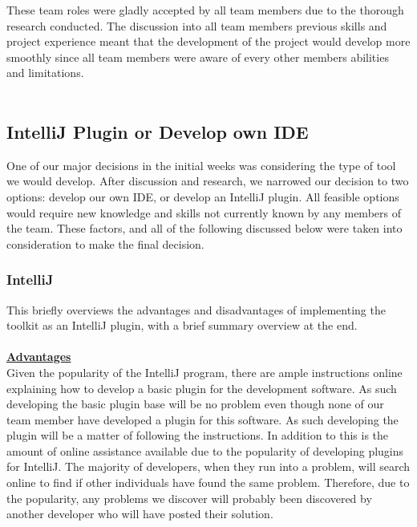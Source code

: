 These team roles were gladly accepted by all team members due to the thorough research conducted. The discussion into all team members previous skills and project experience meant that the development of the project would develop more smoothly since all team members were aware of every other members abilities and limitations.\\
\\

\subsection{IntelliJ Plugin or Develop own IDE}

One of our major decisions in the initial weeks was considering the type of tool we would develop. After discussion and research, we narrowed our decision to two options: develop our own IDE, or develop an IntelliJ plugin.  All feasible options would require new knowledge and skills not currently known by any members of the team. These factors, and all of the following discussed below were taken into consideration to make the final decision.
\\
\subsubsection{IntelliJ}
This briefly overviews the advantages and disadvantages of implementing the toolkit as an IntelliJ plugin, with a brief summary overview at the end.\\
\\
\textbf {\underline{Advantages}}\\
Given the popularity of the IntelliJ program, there are ample instructions online explaining how to develop a basic plugin for the development software. As such developing the basic plugin base will be no problem even though none of our team member have developed a plugin for this software. As such developing the plugin will be a matter of following the instructions. In addition to this is the amount of online assistance available due to the popularity of developing plugins for IntelliJ. The majority of developers, when they run into a problem, will search online to find if other individuals have found the same problem. Therefore, due to the popularity, any problems we discover will probably been discovered by another developer who will have posted their solution. \\
 \\

